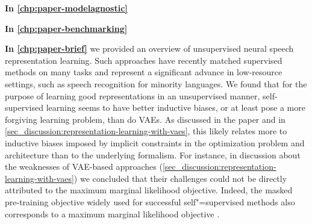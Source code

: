 \vspace{1em}
\textbf{In \cref{chp:paper-modelagnostic}} 

\vspace{1em}
\textbf{In \cref{chp:paper-benchmarking}} 


\vspace{1em}
\textbf{In \cref{chp:paper-brief}} we provided an overview of unsupervised neural speech representation learning. Such approaches have recently matched supervised methods on many tasks and represent a significant advance in low-resource settings, such as speech recognition for minority languages. 
We found that for the purpose of learning good representations in an unsupervised manner, self-supervised learning seems to have better inductive biases, or at least pose a more forgiving learning problem, than do VAEs. As discussed in the paper and in \cref{sec_discussion:representation-learning-with-vaes}, this likely relates more to inductive biases imposed by implicit constraints in the optimization problem and architecture than to the underlying formalism. 
For instance, in discussion about the weaknesses of VAE-based approaches (\cref{sec_discussion:representation-learning-with-vaes}) we concluded that their challenges could not be directly attributed to the maximum marginal likelihood objective. Indeed, the masked pre-training objective widely used for successful self"=supervised methods also corresponds to a maximum marginal likelihood objective \parencite{moreno-munoz_masked_2023}. 

